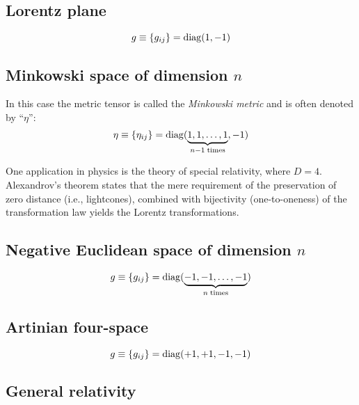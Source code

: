 \subsection*{Lorentz plane}


\begin{equation}
g\equiv \{g_{ij}\}={\rm diag} (1,-1)
\end{equation}

\subsection*{Minkowski space of dimension $n$}

In this case the metric tensor is called the
{\em Minkowski metric}
and is often denoted by  ``$\eta$'':
\begin{equation}
\eta \equiv \{\eta_{ij}\}={\rm diag} (\underbrace{1,1,\ldots ,1}_{n-1\; {\rm times}},-1)
\label{2012-m-ch-tensor-minspn}
\end{equation}


One application in physics is the theory of special relativity,
where $D=4$.
Alexandrov's theorem states that the mere requirement of the preservation of
zero distance (i.e., lightcones), combined with bijectivity (one-to-oneness) of the transformation law
yields the Lorentz transformations.\cite[-70mm]{alex1,alex2,alex3,alex-col,borchers-heger,benz,lester,svozil-2001-convention}



\subsection*{Negative Euclidean space of dimension $n$}

\begin{equation}
g\equiv \{g_{ij}\}={\rm diag} (\underbrace{-1,-1,\ldots ,-1}_{n\; {\rm times}})
\end{equation}

\subsection*{Artinian four-space}

\begin{equation}
g\equiv \{g_{ij}\}={\rm diag} (+1,+1,-1 ,-1)
\end{equation}



\subsection*{General relativity}

